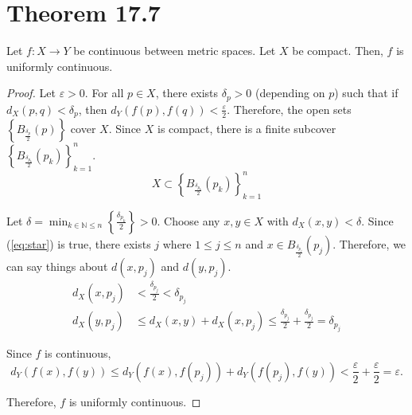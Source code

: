 \documentclass[11pt]{article}
\begin{document}
\section{Theorem 17.7}
    Let $f: X \to Y$ be continuous between metric spaces.
    Let $X$ be compact.
    Then, $f$ is uniformly continuous.
    \begin{proof}
        Let $\varepsilon > 0$.
        For all $p \in X$, there exists $\delta_p > 0$ (depending on $p$) such that if $d_X(p,q) < \delta_p$, then $d_Y(f(p),f(q)) < \frac{\varepsilon}{2}$.
        Therefore, the open sets $\left\{ B_{\frac{\delta_p}{2}}(p) \right\}$ cover $X$.
        Since $X$ is compact, there is a finite subcover $\left\{ B_{\frac{\delta_{p_k}}{2}}(p_k) \right\}_{k=1}^n$.
        \begin{equation}\tag{$\star$} \label{eq:star}
            X \subset \left\{ B_{\frac{\delta_{p_k}}{2}}(p_k) \right\}_{k=1}^n
        \end{equation}

        Let $\delta = \min_{k \in \mathbb{N} \leq n} \left\{ \frac{\delta_{p_k}}{2} \right\} > 0$.
        Choose any $x,y \in X$ with $d_X(x,y) < \delta$.
        Since (\ref{eq:star}) is true, there exists $j$ where $1 \leq j \leq n$ and $x \in B_{\frac{\delta_{p_j}}{2}}(p_j)$.
        Therefore, we can say things about $d(x,p_j)$ and $d(y,p_j)$.
        \begin{align}
            d_X(x,p_j)  &<  \frac{\delta_{p_j}}{2}
                <   \delta_{p_j}\\
            d_X(y,p_j)  &\leq   d_X(x,y) + d_X(x,p_j)
                \leq    \frac{\delta_{p_j}}{2} + \frac{\delta_{p_j}}{2}
                =   \delta_{p_j}
        \end{align}
        
        Since $f$ is continuous, 
        \begin{equation}
            d_Y(f(x),f(y)) \leq d_Y(f(x),f(p_j)) + d_Y(f(p_j),f(y)) < \frac{\varepsilon}{2} + \frac{\varepsilon}{2} = \varepsilon.
        \end{equation}

        Therefore, $f$ is uniformly continuous.
    \end{proof}
\end{document}
